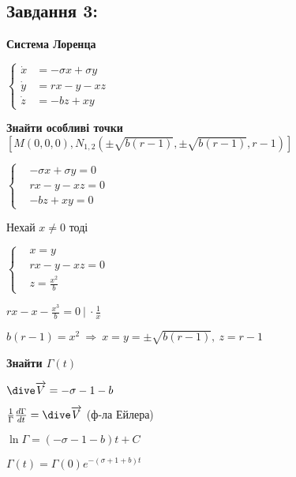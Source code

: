 \subsection*{Завдання 3:}
\textbf{Система Лоренца}

$\left\{\begin{aligned}
    \dot{x} &= -\sigma x + \sigma y \\
    \dot{y} &= rx - y - xz\\
    \dot{z} &= -bz + xy
\end{aligned}\right.$

\textbf{Знайти особливі точки $[M(0,0,0), N_{1,2}(\pm\sqrt{b(r-1)},\pm\sqrt{b(r-1)}, r-1 )]$} 

$\left\{\begin{aligned}
    &-\sigma x + \sigma y  = 0\\
    &rx - y - xz = 0\\
    &-bz + xy = 0
\end{aligned}\right.$

Нехай $x\neq 0$ тоді

$\left\{\begin{aligned}
    &x = y\\
    &rx - y - xz = 0\\ 
    &z = \frac{x^2}{b}
\end{aligned}\right.$

$rx - x - \frac{x^3}{b} = 0 \ | \ \cdot \frac{1}{x}$

$b(r - 1) = x^2 \ \Longrightarrow \ x = y = \pm \sqrt{b(r-1)}, \ z = r- 1$

\textbf{Знайти $\Gamma(t)$}

$\dive \overrightarrow{V} = -\sigma  - 1 -b$

$\frac{1}{\Gamma} \frac{d\Gamma}{dt} = \dive \overrightarrow{V}$ (ф-ла Ейлера)

$\ln \Gamma = (-\sigma - 1 - b)t + C$

$\Gamma(t) = \Gamma(0) e^{-(\sigma + 1 + b)t}$